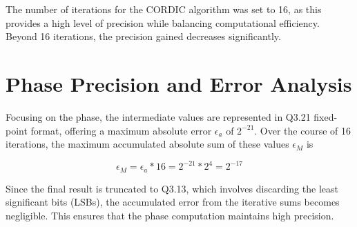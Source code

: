 The number of iterations for the CORDIC algorithm was set to 16, as this provides a high level of precision while balancing computational efficiency. Beyond 16 iterations, the precision gained decreases significantly.

\section{Phase Precision and Error Analysis}
Focusing on the phase, the intermediate values are represented in Q3.21 fixed-point format, offering a maximum absolute error \( \epsilon_a \) of \(2^{-21}\). Over the course of 16 iterations, the maximum accumulated absolute sum of these values \( \epsilon_M \) is

\[
    \epsilon_M = \epsilon_a * 16 = 2^{-21} * 2^{4} = 2^{-17}
\]

Since the final result is truncated to Q3.13, which involves discarding the least significant bits (LSBs), the accumulated error from the iterative sums becomes negligible. This ensures that the phase computation maintains high precision.